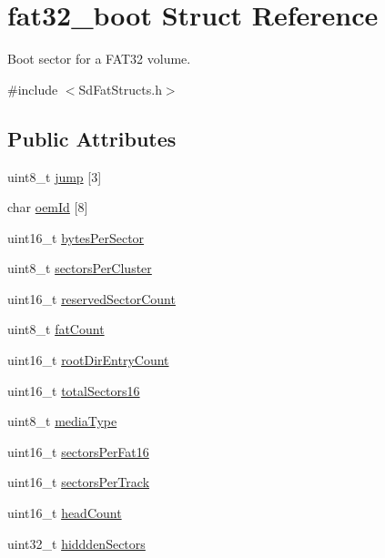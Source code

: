 \hypertarget{structfat32__boot}{}\section{fat32\+\_\+boot Struct Reference}
\label{structfat32__boot}


Boot sector for a F\+A\+T32 volume.  




{\ttfamily \#include $<$Sd\+Fat\+Structs.\+h$>$}

\subsection*{Public Attributes}
\begin{DoxyCompactItemize}
\item 
uint8\+\_\+t \hyperlink{structfat32__boot_a2d93fc193a64ecffbd71ead207fe4810}{jump} \mbox{[}3\mbox{]}
\item 
char \hyperlink{structfat32__boot_af623a473a960ea20904dce0edfb6bb9d}{oem\+Id} \mbox{[}8\mbox{]}
\item 
uint16\+\_\+t \hyperlink{structfat32__boot_a03c7086a8c988257a6678179a67a3fee}{bytes\+Per\+Sector}
\item 
uint8\+\_\+t \hyperlink{structfat32__boot_a63ded2780732f166f7b7d36bc6aed702}{sectors\+Per\+Cluster}
\item 
uint16\+\_\+t \hyperlink{structfat32__boot_a8e490f05ad3552dfbdf8f9332d287ba0}{reserved\+Sector\+Count}
\item 
uint8\+\_\+t \hyperlink{structfat32__boot_a7882fa8744bd171bfa1512bd442574bc}{fat\+Count}
\item 
uint16\+\_\+t \hyperlink{structfat32__boot_a94185496fb56c6e0e8078fc3803e9142}{root\+Dir\+Entry\+Count}
\item 
uint16\+\_\+t \hyperlink{structfat32__boot_acbcae2f15475a886f674f932da1deb3f}{total\+Sectors16}
\item 
uint8\+\_\+t \hyperlink{structfat32__boot_a3b1ab5d2dc872c0d80cd4f34622de417}{media\+Type}
\item 
uint16\+\_\+t \hyperlink{structfat32__boot_aeaa78272cd42b162ea448e1642f75cab}{sectors\+Per\+Fat16}
\item 
uint16\+\_\+t \hyperlink{structfat32__boot_a9525b2e63f84a5cf62ea20199cedf5de}{sectors\+Per\+Track}
\item 
uint16\+\_\+t \hyperlink{structfat32__boot_a1a5298db692526bc64243766d6b54181}{head\+Count}
\item 
uint32\+\_\+t \hyperlink{structfat32__boot_ab10224aa4bba42b262fcd3479e279e1f}{hiddden\+Sectors}

\end{DoxyCompactItemize}
